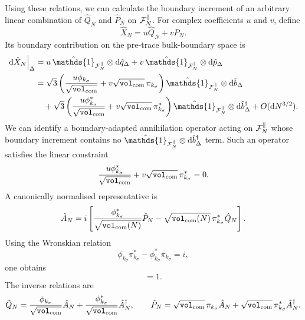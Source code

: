 \documentclass{article}
\def\cF{{\cal F}}
\newcommand{\openone}{\hat{\mathds{1}}}
\newcommand{\VF}{\mathtt{vol}_{\rm com}}
\numberwithin{equation}{section}
\begin{document}
	Using these relations, we can calculate the boundary increment of an arbitrary linear combination of \(\hat Q_{N}\) and \(\hat P_{N}\) on \(\cF_{N}^\parallel\). For complex coefficients \(u\) and \(v\), define
	\begin{equation}
		\hat X_{N} = u\hat Q_{N} + v\hat P_{N}.
	\end{equation}
	Its boundary contribution on the pre-trace bulk-boundary space is
	\begin{align}
		\left.\dd\hat X_N\right|_\Delta &= u\,\openone_{\cF_N^\parallel}\otimes \dd\hat q_\Delta + v\,\openone_{\cF_N^\parallel}\otimes \dd\hat p_\Delta \nonumber\\ &= \sqrt3 \left( \frac{u\phi_{k_{\sigma}}}{\sqrt{\VF}} + v\sqrt{\VF}\,\pi_{k_{\sigma}} \right)\openone_{\cF_N^\parallel}\otimes \dd\hat b_\Delta \nonumber\\ &\quad + \sqrt3 \left( \frac{u\phi_{k_{\sigma}}^*}{\sqrt{\VF}} + v\sqrt{\VF}\,\pi_{k_{\sigma}}^* \right)\openone_{\cF_N^\parallel}\otimes \dd\hat b_\Delta^\dagger + O(\dd N^{3/2}).
	\end{align}
	We can identify a boundary-adapted annihilation operator acting on \(\cF_N^\parallel\) whose boundary increment contains no \(\openone_{\cF_N^\parallel}\otimes \dd\hat b_\Delta^\dagger\) term. Such an operator satisfies the linear constraint
	\begin{equation}
		\frac{u\phi_{k_{\sigma}}^*}{\sqrt{\VF}} + v\sqrt{\VF}\,\pi_{k_{\sigma}}^* = 0.
		\label{eq:AnnihilationConstraintApp}
	\end{equation}
	A canonically normalised representative is
	\begin{equation}
		\hat A_{N} = i\left[ \frac{\phi_{k_{\sigma}}^*}{\sqrt{\VF(N)}}\hat P_{N} - \sqrt{\VF(N)}\,\pi_{k_{\sigma}}^*\hat Q_{N} \right].
		\label{eq:AdefApp}
	\end{equation}
	Using the Wronskian relation
	\begin{equation}
		\phi_{k_{\sigma}}\pi_{k_{\sigma}}^* - \phi_{k_{\sigma}}^*\pi_{k_{\sigma}} = i,
		\label{eq:WronskianApp}
	\end{equation}
	one obtains
	\begin{equation}
		[\hat A_{N},\hat A_{N}^\dagger]=1.
	\end{equation}
	The inverse relations are
	\begin{equation}
		\hat Q_{N} = \frac{\phi_{k_{\sigma}}}{\sqrt{\VF}}\hat A_{N} + \frac{\phi_{k_{\sigma}}^*}{\sqrt{\VF}}\hat A_{N}^\dagger, \qquad \hat P_{N} = \sqrt{\VF}\,\pi_{k_{\sigma}}\hat A_{N} + \sqrt{\VF}\,\pi_{k_{\sigma}}^*\hat A_{N}^\dagger .
		\label{eq:QPfromA}
	\end{equation}
\end{document}
